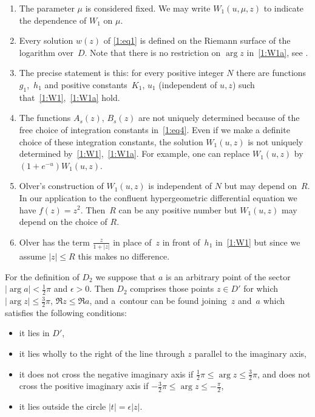 \documentclass[11pt]{article}
\numberwithin{equation}{section}
\begin{document}
\begin{Remarks}\quad
\begin{enumerate}\itemsep=0pt
\item
The parameter $\mu$ is considered f\/ixed. We may write $W_1(u,\mu,z)$ to indicate the dependence of $W_1$ on $\mu$.
\item
Every solution $w(z)$ of \eqref{1:eq1} is def\/ined on the Riemann surface of the logarithm over~$D$. Note that there is no restriction on $\arg z$ in~\eqref{1:W1a}, see \cite[p.~76]{O}.
\item
The precise statement is this: for every positive integer $N$ there are functions~$g_1$,~$h_1$ and positive constants~$K_1$, $u_1$ (independent of $u,z$)
such that~\eqref{1:W1},~\eqref{1:W1a} hold.
\item
The functions $A_s(z)$, $B_s(z)$ are not uniquely determined because of the free choice of
integration constants in~\eqref{1:eq4}. Even if we make a def\/inite choice of these integration constants, the solution $W_1(u,z)$
is not uniquely determined by~\eqref{1:W1},~\eqref{1:W1a}. For example, one can replace $W_1(u,z)$ by $(1+e^{-u})W_1(u,z)$.
\item
Olver's construction of $W_1(u,z)$ is independent of $N$ but may depend on~$R$.
In our application to the conf\/luent hypergeometric dif\/ferential equation we have $f(z)=z^2$. Then~$R$ can be any positive number
but $W_1(u,z)$ may depend on the choice of $R$.
\item
Olver has the term $\frac{z}{1+|z|}$ in place of~$z$ in front of~$h_1$ in~\eqref{1:W1} but since we assume $|z|\le R$ this makes no dif\/ference.
\end{enumerate}
\end{Remarks}

For the def\/inition of $D_2$ we suppose that $a$ is an arbitrary point of the sector $|\arg a|<\frac12\pi$ and $\epsilon>0$.
Then $D_2$ comprises those points $z\in D'$ for which $|\arg z|\le\frac32\pi$, $\Re z\le \Re a$, and a~contour can be found joining~$z$ and~$a$
which satisf\/ies the following conditions:
\begin{itemize}\itemsep=0pt
\item[(i)] it lies in $D'$,
\item[(ii)]
it lies wholly to the right of the line through $z$ parallel to the imaginary axis,
\item[(iii)]
it does not cross the negative imaginary axis if $\frac12\pi\le \arg z\le \frac32\pi$, and does not cross
the positive imaginary axis if $-\frac32\pi\le \arg z\le -\frac\pi2$,
\item[(iv)]
it lies outside the circle $|t|=\epsilon |z|$.
\end{itemize}
\end{document}
